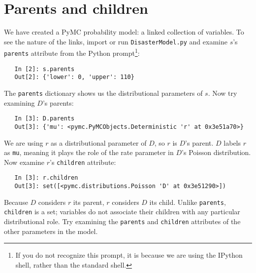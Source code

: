 \section*{Parents and children}

We have created a PyMC probability model: a linked collection of variables. To see the nature of the links, import or run \texttt{DisasterModel.py} and examine $s$'s \texttt{parents} attribute from the Python prompt\footnote{If you do not recognize this prompt, it is because we are using the IPython shell, rather than the standard shell.}:
\begin{verbatim}
   In [2]: s.parents
   Out[2]: {'lower': 0, 'upper': 110}
\end{verbatim}
The \texttt{parents} dictionary shows us the distributional parameters of $s$. Now try examining $D$'s parents:
\begin{verbatim}
   In [3]: D.parents
   Out[3]: {'mu': <pymc.PyMCObjects.Deterministic 'r' at 0x3e51a70>}
\end{verbatim}
We are using $r$ as a distributional parameter of $D$, so $r$ is $D$'s parent. $D$ labels $r$ as \texttt{mu}, meaning it plays the role of the rate parameter in $D$'s Poisson distribution. Now examine $r$'s \texttt{children} attribute:
\begin{verbatim}
   In [3]: r.children
   Out[3]: set([<pymc.distributions.Poisson 'D' at 0x3e51290>])
\end{verbatim}
Because $D$ considers $r$ its parent, $r$ considers $D$ its child. Unlike \texttt{parents}, \texttt{children} is a set; variables do not associate their children with any particular distributional role. Try examining the \texttt{parents} and \texttt{children} attributes of the other parameters in the model.

